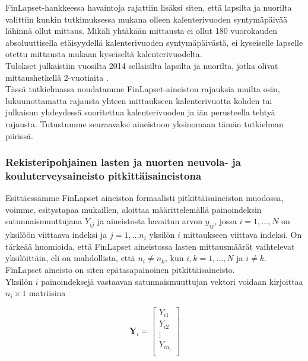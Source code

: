 \documentclass[finnish]{docopts}
\begin{document}
FinLapset-hankkeessa havaintoja rajattiin lisäksi siten, että lapsilta ja nuorilta valittiin kunkin tutkimuksessa mukana olleen kalenterivuoden syntymäpäivää lähinnä ollut mittaus. Mikäli yhtäkään mittausta ei ollut 180 vuorokauden absoluuttisella etäisyydellä kalenterivuoden syntymäpäivästä, ei kyseiselle lapselle otettu mittausta mukaan kyseiseltä kalenterivuodelta. \\

Tulokset julkaistiin vuosilta 2014 sellaisilta lapsilta ja nuorilta, jotka olivat mittaushetkellä 2-vuotiaita \cite{finlapsetrekisteri}. \\

Tässä tutkielmassa noudatamme FinLapset-aineiston rajauksia muilta osin, lukuunottamatta rajausta yhteen mittaukseen kalenterivuotta kohden tai julkaisun yhdeydessä suoritettua kalenterivuoden ja iän perusteella tehtyä rajausta. Tutustumme seuraavaksi aineistoon yksinomaan tämän tutkielman piirissä.\\

\subsubsection{Rekisteripohjainen lasten ja nuorten neuvola- ja kouluterveysaineisto pitkittäisaineistona}
\label{ssb:rekpitkittais}

Esittäessämme FinLapset aineiston formaalisti pitkittäisaineiston muodossa, voimme, \cite{fitzmaurice11} esitystapaa mukaillen, aloittaa määrittelemällä painoindeksin satunnaismuuttujana $Y_{ij}$ ja aineistosta havaitun arvon $y_{ij}$, jossa $i = 1, \dots, N$ on yksilöön viittaava indeksi ja $j = 1, \dots n_i$ yksilön $i$ mittaukseen viittava indeksi. On tärkeää huomioida, että FinLapset aineistossa lasten mittausmäärät vaihtelevat yksilöittäin, eli on mahdollista, että $n_i \neq n_k$, kun $i,k = 1,\dots, N$ ja $i \neq k$. FinLapset aineisto on siten epätasapainoinen pitkittäisaineisto.\\

Yksilön $i$ painoindeksejä vastaavan satunnaismuuttujan vektori voidaan kirjoittaa $n_i \times 1$ matriisina

$$
\bm{Y}_i = 
\begin{bmatrix}
Y_{i1} \\
Y_{i2} \\
\vdots \\
Y_{in_i} \\
\end{bmatrix}
$$
\end{document}
